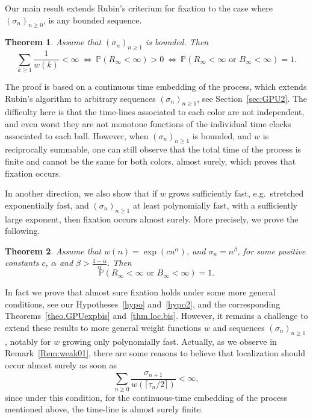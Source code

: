 \documentclass[11pt]{article}
\newtheorem {theo} {Theorem} [section]
\newcommand{\1}{{\text{\Large $\mathfrak 1$}}}
\begin{document}
\vspace{0.2cm}
Our main result extends Rubin's criterium for fixation to the case where $(\sigma_n)_{n\ge 0}$, is any bounded sequence. 

\begin{theo} \label{thm:GPU}
Assume that $(\sigma_n)_{n\ge 1}$ is bounded. Then 
$$\sum_{k\ge 1} \frac 1{w(k)}<\infty\ \Longleftrightarrow\ \mathbb P(R_\infty <\infty) >0\ \Longleftrightarrow\ \mathbb P(R_\infty <\infty\textrm{ or }B_\infty<\infty) = 1. $$ 
\end{theo}
The proof is based on a continuous time embedding of the process, which extends Rubin's algorithm to arbitrary sequences $(\sigma_n)_{n\ge 1}$, see Section~\ref{sec:GPU2}. The difficulty here is that the time-lines associated to each color are not independent, and even worst they are not monotone functions of the individual time clocks associated to each ball. However, when $(\sigma_n)_{n\ge 1}$ is bounded, and $w$ is reciprocally summable, one can still observe that the total time of the process is finite and cannot be the same for both colors, almost surely, which proves that fixation occurs. 

\vspace{0.2cm}
In another direction, we also show that if $w$ grows sufficiently fast, e.g.~stretched exponentially fast, and $(\sigma_n)_{n\ge 1}$ at least polynomially fast, with a sufficiently large exponent, then fixation occurs almost surely. More precisely, we prove the following. 

\begin{theo}\label{thm:GPUexp}
Assume that $w(n) = \exp(cn^\alpha)$, and $\sigma_n = n^\beta$, for some positive constants $c$, $\alpha$ and $\beta> \frac{1-\alpha}{\alpha}$. Then 
$$  \mathbb P(R_\infty <\infty\textrm{ or }B_\infty<\infty) = 1. $$ 
\end{theo}
In fact we prove that almost sure fixation holds under some more general conditions, see our Hypotheses~\ref{hypo} and~\ref{hypo2}, and the corresponding Theorems~\ref{theo.GPUexpbis} and~\ref{thm.loc.bis}.  
However, it remains a challenge to extend these results to more general weight functions $w$ and sequences $(\sigma_n)_{n\ge 1}$, notably for $w$ growing only polynomially fast. 
Actually, as we observe in Remark~\ref{Rem:weak01}, there are some reasons to believe that localization should occur almost surely as soon as 
$$\sum_{n\ge 0} \frac{\sigma_{n+1}}{w(\lceil \tau_n/2\rceil)} <\infty,$$
since under this condition, for the continuous-time embedding of the process mentioned above, the time-line is almost surely finite.  
\end{document}
